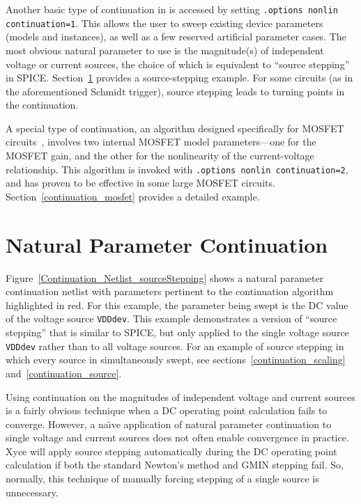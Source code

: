 Another basic type of continuation in \Xyce{} is accessed by setting
\texttt{.options nonlin continuation=1}. This allows the user to sweep existing
device parameters (models and instances), as well as a few reserved artificial
parameter cases. The most obvious natural parameter to use is the magnitude(s)
of independent voltage or current sources, the choice of which is equivalent to
``source stepping'' in SPICE.  Section~\ref{continuation_natural} provides a
\Xyce{} source-stepping example.  For some circuits (as in the aforementioned
Schmidt trigger), source stepping leads to turning points in the continuation.  

A special type of continuation, an algorithm designed specifically for MOSFET
circuits~\cite{ROYCHOWDHURY:2003}, involves two internal MOSFET model
parameters---one for the MOSFET gain, and the other for the nonlinearity of the
current-voltage relationship.  This algorithm is invoked with \texttt{.options
nonlin continuation=2}, and has proven to be effective in some large MOSFET
circuits.  Section~\ref{continuation_mosfet} provides a detailed example.

\newpage 
\section{Natural Parameter Continuation}
\label{continuation_natural}

Figure~\ref{Continuation_Netlist_sourceStepping} shows a natural parameter
continuation netlist with parameters pertinent to the continuation algorithm
highlighted in red.  For this example, the parameter being swept is
the DC value of the voltage source \texttt{VDDdev}.  This
example demonstrates a version of ``source stepping'' that is similar to SPICE,
but only applied to the single voltage source \texttt{VDDdev} rather than to all 
voltage sources.  For an example of source stepping in which every source 
in simultaneously swept, see sections~\ref{continuation_scaling} and~\ref{continuation_source}.

Using continuation on the magnitudes of independent voltage and current sources 
is a fairly obvious technique when a DC operating point calculation fails to 
converge.  However, a na\"{\i}ve application of natural parameter continuation
to single voltage and current sources does not often enable convergence in practice.  
Xyce will apply source stepping automatically during the DC operating point calculation 
if both the standard Newton's method and GMIN stepping fail.  So, normally, this 
technique of manually forcing stepping of a single source is unnecessary.


